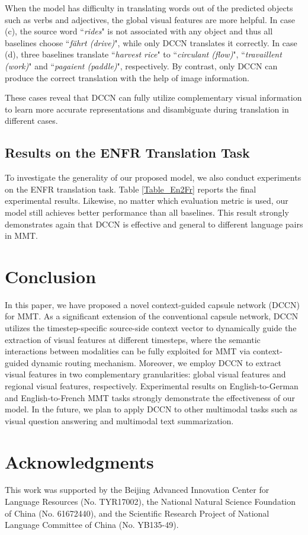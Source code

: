 \documentclass[sigconf]{acmart}
\begin{document}
When the model has difficulty in translating words out of the predicted objects such as verbs and adjectives, the global visual features are more helpful. In case (c), the source word ``\emph{rides}" is not associated with any object and thus all baselines choose ``\emph{fährt (drive)}", while only DCCN translates it correctly. In case (d), three baselines translate ``\emph{harvest rice}" to ``\emph{circulant (flow)}", ``\emph{travaillent (work)}" and ``\emph{pagaient (paddle)}", respectively. By contrast, only DCCN can produce the correct translation with the help of image information. 

These cases reveal that DCCN can fully utilize complementary visual information to learn more accurate representations and disambiguate during translation in different cases.




\subsection{Results on the ENFR Translation Task}

To investigate the generality of our proposed model, we also conduct experiments on the ENFR translation task. Table \ref{Table_En2Fr} reports the final experimental results. Likewise, no matter which evaluation metric is used, our model still achieves  better performance than all baselines. This result strongly demonstrates again that DCCN is effective and general to different language pairs in MMT.






\section{Conclusion}
In this paper,
we have proposed a novel context-guided capsule network (DCCN) for MMT. As a significant extension of the conventional capsule network, 
DCCN utilizes the timestep-specific source-side context vector to dynamically guide the extraction of visual features at different timesteps, where the semantic interactions between modalities can be fully exploited for MMT via context-guided dynamic routing mechanism. Moreover, we employ DCCN to extract visual features in two complementary granularities: global visual features and regional visual features, respectively. 
Experimental results on English-to-German and English-to-French MMT tasks strongly demonstrate the effectiveness of our model. 
In the future, 
we plan to apply DCCN to other multimodal tasks such as visual question answering and multimodal text summarization.


\section{Acknowledgments}
This work was supported by the Beijing Advanced Innovation Center for Language Resources (No. TYR17002), the National Natural Science Foundation of China (No. 61672440), and the Scientific Research Project of National Language Committee of China (No. YB135-49).



\balance


\appendix
\end{document}
